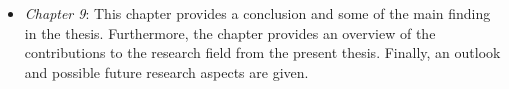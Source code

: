 \begin{itemize}
	\item \textit{Chapter 9}: This chapter provides a conclusion and some of the main finding in the thesis. Furthermore, the chapter provides an overview of the contributions to the research field from the present thesis. Finally, an outlook and possible future research aspects are given.

	
\end{itemize}

